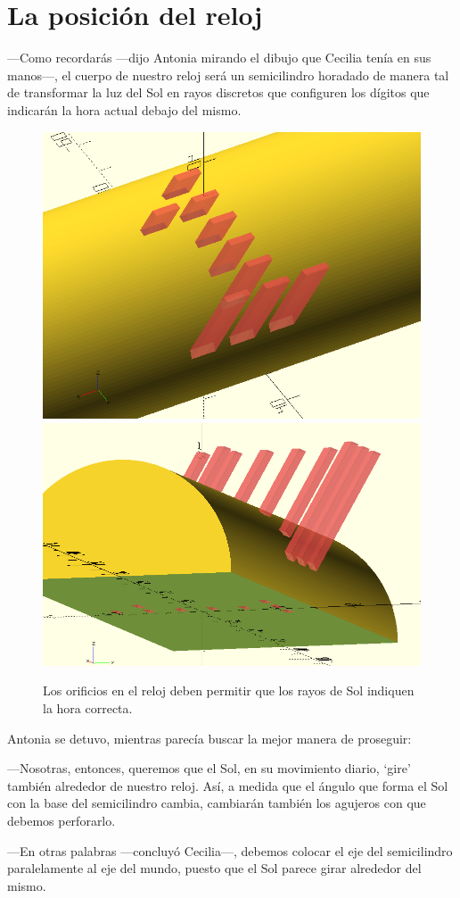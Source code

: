 \section{La posición del reloj}


---Como recordarás ---dijo Antonia mirando el dibujo que Cecilia tenía
en sus manos---, el cuerpo de nuestro reloj será un semicilindro
horadado de manera tal de transformar la luz del Sol en rayos
discretos que configuren los dígitos que indicarán la hora actual
debajo del mismo.

\begin{figure}[ht]
  \centering
     \includegraphics[width=.47\textwidth]{imagenes/digito-corte-1}\hfill
     \includegraphics[width=.47\textwidth]{imagenes/digito-corte-2}
     \caption{Los orificios en el reloj deben permitir que los rayos
       de Sol indiquen la hora correcta.}
     \label{fig:orificios-correctos}
\end{figure}

Antonia se detuvo, mientras parecía buscar la mejor manera de
proseguir:

---Nosotras, entonces, queremos que el Sol, en su movimiento diario,
`gire' también alrededor de nuestro reloj.  Así, a medida que el
ángulo que forma el Sol con la base del semicilindro cambia, cambiarán
también los agujeros con que debemos perforarlo.

---En otras palabras ---concluyó Cecilia---, debemos colocar el eje
del semicilindro paralelamente al eje del mundo, puesto que el Sol
parece girar alrededor del mismo.


